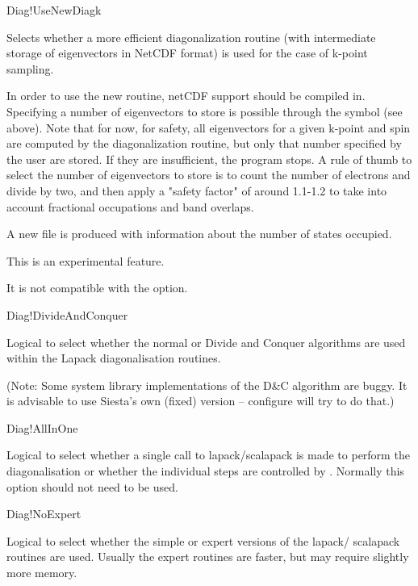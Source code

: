 \begin{fdflogicalF}{Diag!UseNewDiagk}

  Selects whether a more efficient diagonalization routine (with
  intermediate storage of eigenvectors in NetCDF format) is used for
  the case of k-point sampling.

  In order to use the new routine, netCDF support should be compiled
  in.  Specifying a number of eigenvectors to store is possible
  through the symbol  (see above). Note that for
  now, for safety, all eigenvectors for a given k-point and spin are
  computed by the diagonalization routine, but only that number
  specified by the user are stored. If they are insufficient, the
  program stops.  A rule of thumb to select the number of eigenvectors
  to store is to count the number of electrons and divide by two, and
  then apply a "safety factor" of around 1.1-1.2 to take into account
  fractional occupations and band overlaps.

  A new file  is produced with information about the number
  of states occupied.

  This is an experimental feature. 

  \note It is not compatible with the 
  option.

\end{fdflogicalF}


\begin{fdflogicalT}{Diag!DivideAndConquer}

  Logical to select whether the normal or Divide and Conquer
  algorithms are used within the Lapack diagonalisation routines.

  (Note: Some system library implementations of the D\&C algorithm are
  buggy. It is advisable to use Siesta's own (fixed) version --
  configure will try to do that.)
  
\end{fdflogicalT}

\begin{fdflogicalF}{Diag!AllInOne}

  Logical to select whether a single call to lapack/scalapack is made
  to perform the diagonalisation or whether the individual steps are
  controlled by \siesta. Normally this option should not need to be
  used.
  
\end{fdflogicalF}

\begin{fdflogicalF}{Diag!NoExpert}

  Logical to select whether the simple or expert versions of the
  lapack/ scalapack routines are used. Usually the expert routines are
  faster, but may require slightly more memory.

\end{fdflogicalF}

